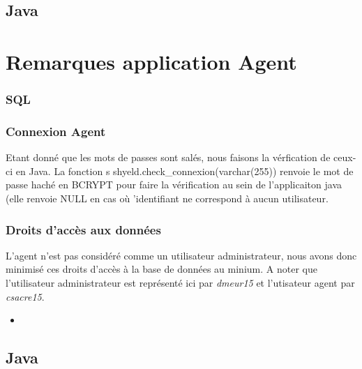 \documentclass{article}[12pt]
\newcommand{\SQLcode}[2]{
	\begin{itemize}
		\item[]
	\end{itemize}
}
\begin{document}
	\subsection{Java}
	
	
	\section{Remarques application Agent}
	\label{agent}
	\subsubsection{SQL}

	\subsubsection{Connexion Agent}
	Etant donné que les mots de passes sont salés, nous faisons la vérfication de ceux-ci en Java. La fonction s shyeld.check\_connexion(varchar(255)) renvoie le mot de passe haché en BCRYPT pour faire la vérification au sein de l'applicaiton java (elle renvoie NULL en cas où 'identifiant ne correspond à aucun utilisateur.
	\subsubsection{Droits d'accès aux données}
	L'agent n'est pas considéré comme un utilisateur administrateur, nous avons donc minimisé ces droits d'accès à la base de données au minium. A noter que l'utilisateur administrateur est représenté ici par \textit{dmeur15} et l'utisateur agent par \textit{csacre15}.
	\SQLcode{grant}{Droits d'accès à la base de données pour un agent}
	\subsection{Java}
	
\end{document}
